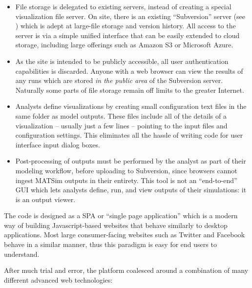 \begin{itemize}
  \item File storage is delegated to existing servers, instead of creating a special visualization file server. On site, there is an existing ``Subversion'' server (see \cite{Fitzpatrick2004Subversion}) which is adept at large-file storage and version history. All access to the server is via a simple unified interface that can be easily extended to cloud storage, including large offerings such as Amazon S3 or Microsoft Azure.

  \item As the site is intended to be publicly accessible, all user authentication capabilities is discarded. Anyone with a web browser can view the results of any runs which are stored \emph{in the public area} of the Subversion server. Naturally some parts of file storage remain off limits to the greater Internet.

  \item Analysts define visualizations by creating small configuration text files in the same folder as model outputs. These files include all of the details of a visualization -- usually just a few lines -- pointing to the input files and configuration settings. This eliminates all the hassle of writing code for user interface input dialog boxes.

  \item Post-processing of outputs must be performed by the analyst as part of their modeling workflow, before uploading to Subversion, since browsers cannot ingest MATSim outputs in their entirety. This tool is not an ``end-to-end'' GUI which lets analysts define, run, and view outputs of their simulations: it is an output viewer.
\end{itemize}

The code is designed as a \gls{SPA} or ``single page application'' which is a modern way of building Javascript-based websites that behave similarly to desktop applications. Most large consumer-facing websites such as Twitter and Facebook behave in a similar manner, thus this paradigm is easy for end users to understand.

After much trial and error, the platform coalesced around a combination of many different advanced web technologies:

